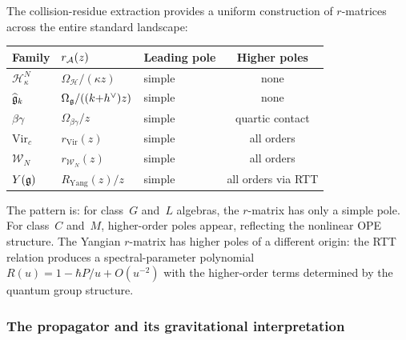 \begin{remark}
The collision-residue extraction provides a uniform construction of
$r$-matrices across the entire standard landscape:
\begin{center}
\renewcommand{\arraystretch}{1.2}
\begin{tabular}{@{}lllc@{}}
\toprule
\textbf{Family} & \textbf{$r_{\mathcal{A}}(z)$}
 & \textbf{Leading pole} & \textbf{Higher poles} \\
\midrule
$\mathcal{H}^N_\kappa$ & $\Omega_{\mathcal{H}}/(\kappa z)$
 & simple & none \\
$\widehat{\mathfrak{g}}_k$ & $\Omega_{\mathfrak{g}}/((k{+}h^\vee)z)$
 & simple & none \\
$\beta\gamma$ & $\Omega_{\beta\gamma}/z$
 & simple & quartic contact \\
$\mathrm{Vir}_c$ & $r_{\mathrm{Vir}}(z)$
 & simple & all orders \\
$\mathcal{W}_N$ & $r_{\mathcal{W}_N}(z)$
 & simple & all orders \\
$Y(\mathfrak{g})$ & $R_{\mathrm{Yang}}(z)/z$
 & simple & all orders via RTT \\
\bottomrule
\end{tabular}
\end{center}
The pattern is: for class~$G$ and~$L$ algebras, the $r$-matrix has
only a simple pole. For class~$C$ and~$M$, higher-order poles
appear, reflecting the nonlinear OPE structure. The Yangian
$r$-matrix has higher poles of a different origin:
the RTT relation produces a spectral-parameter polynomial
$R(u) = 1 - \hbar P/u + O(u^{-2})$ with the higher-order terms
determined by the quantum group structure.
\end{remark}


\subsubsection{The propagator and its gravitational interpretation}

